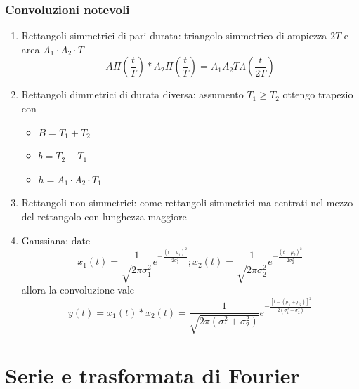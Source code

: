 \subsubsection*{Convoluzioni notevoli}
\begin{enumerate}
	\item Rettangoli simmetrici di pari durata: triangolo simmetrico di ampiezza  $ 2T $ e area $ A_1 \cdot  A_2 \cdot T $
	      \[
		      A \Pi \left(\frac{t}{T}\right) * A_2 \Pi \left(\frac{t}{T}\right) = A_1A_2T \Lambda \left(\frac{t}{2T}\right)
	      \]
	\item Rettangoli dimmetrici di durata diversa: assumento $ T_1 \ge T_2 $ ottengo trapezio con
	      \begin{itemize}
		      \item $ B = T_1  + T_2 $
		      \item  $ b = T_2 - T_1 $
		      \item  $ h = A_1 \cdot A_2 \cdot  T_1 $
	      \end{itemize}
	\item Rettangoli non simmetrici: come rettangoli simmetrici ma centrati nel mezzo del rettangolo con lunghezza maggiore
	\item Gaussiana: date
	      \[
		      x_1(t)=\frac{1}{\sqrt{2 \pi \sigma_1^2}} e^{-\frac{\left(t-\mu_1\right)^2}{2 \sigma_1^2}} ; x_2(t)=\frac{1}{\sqrt{2 \pi \sigma_2^2}} e^{-\frac{\left(t-\mu_2\right)^2}{2 \sigma_2^2}}
	      \]
	      allora la convoluzione vale
	      \[
		      y(t)=x_1(t) * x_2(t)=\frac{1}{\sqrt{2 \pi\left(\sigma_1^2+\sigma_2^2\right)}} e^{-\frac{\left[t-\left(\mu_1+\mu_2\right)\right]^2}{2\left(\sigma_1^2+\sigma_2^2\right)}}
	      \]
\end{enumerate}
\section{Serie e trasformata di Fourier}


